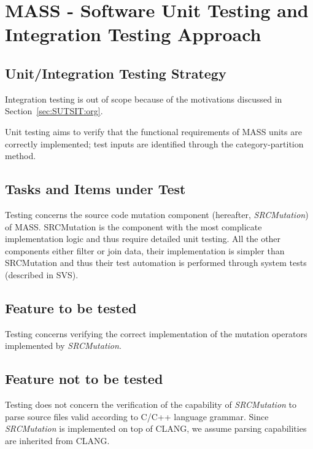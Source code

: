 
\chapter{MASS - Software Unit Testing and Integration Testing Approach}


\section{Unit/Integration Testing Strategy}

Integration testing is out of scope because of the motivations discussed in Section~\ref{sec:SUTSIT:org}.

Unit testing aims to verify that the functional requirements of MASS units are correctly implemented; test inputs are identified through the category-partition method.


\section{Tasks and Items under Test}

Testing concerns the source code mutation component (hereafter, \emph{SRCMutation}) of MASS.
SRCMutation is the component with the most complicate implementation logic and thus require detailed unit testing.
All the other components either filter or join data, their implementation is simpler than SRCMutation and thus their test automation is performed through system tests (described in SVS).

\section{Feature to be tested}

Testing concerns verifying the correct implementation of the mutation operators implemented by \emph{SRCMutation}.

\section{Feature not to be tested}

Testing does not concern the verification of the capability of \emph{SRCMutation} to parse source files valid according to C/C++ language grammar. Since \emph{SRCMutation} is implemented on top of CLANG, we assume parsing capabilities are inherited from CLANG.



